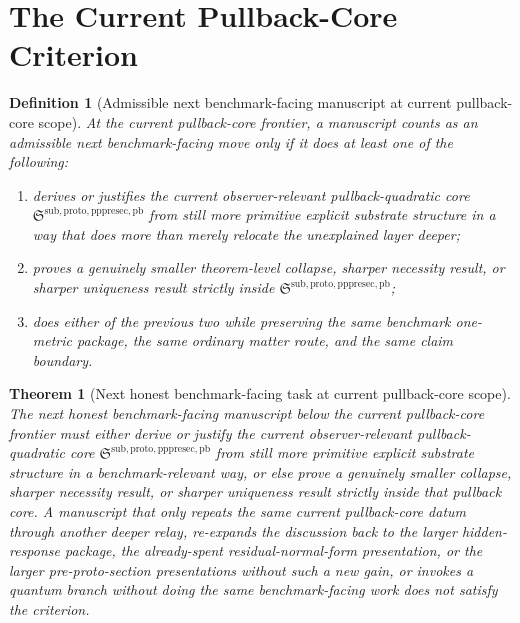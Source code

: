 \documentclass[11pt]{article}
\newcommand{\PrePreProtoSectionPullbackCore}{\mathfrak S^{\mathrm{sub,proto,pppresec,pb}}}
\newtheorem{definition}{Definition}
\newtheorem{theorem}{Theorem}
\begin{document}
\section{The Current Pullback-Core Criterion}

\begin{definition}[Admissible next benchmark-facing manuscript at current pullback-core scope]
At the current pullback-core frontier, a manuscript counts as an admissible next benchmark-facing move only if it does at least one of the following:
\begin{enumerate}
    \item derives or justifies the current observer-relevant pullback-quadratic core \(\PrePreProtoSectionPullbackCore\) from still more primitive explicit substrate structure in a way that does more than merely relocate the unexplained layer deeper;
    \item proves a genuinely smaller theorem-level collapse, sharper necessity result, or sharper uniqueness result strictly inside \(\PrePreProtoSectionPullbackCore\);
    \item does either of the previous two while preserving the same benchmark one-metric package, the same ordinary matter route, and the same claim boundary.
\end{enumerate}
\end{definition}

\begin{theorem}[Next honest benchmark-facing task at current pullback-core scope]
The next honest benchmark-facing manuscript below the current pullback-core frontier must either derive or justify the current observer-relevant pullback-quadratic core \(\PrePreProtoSectionPullbackCore\) from still more primitive explicit substrate structure in a benchmark-relevant way, or else prove a genuinely smaller collapse, sharper necessity result, or sharper uniqueness result strictly inside that pullback core. A manuscript that only repeats the same current pullback-core datum through another deeper relay, re-expands the discussion back to the larger hidden-response package, the already-spent residual-normal-form presentation, or the larger pre-proto-section presentations without such a new gain, or invokes a quantum branch without doing the same benchmark-facing work does not satisfy the criterion.
\end{theorem}
\end{document}
